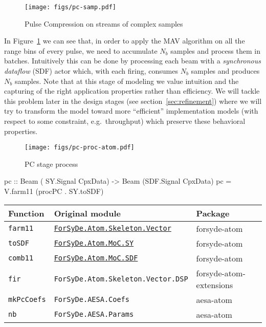 \documentclass[
  a4paper,
]{article}
\newenvironment{Shaded}{}{}
\newcommand{\DataTypeTok}[1]{\textcolor[rgb]{0.56,0.13,0.00}{#1}}
\newcommand{\FunctionTok}[1]{\textcolor[rgb]{0.02,0.16,0.49}{#1}}
\newcommand{\NormalTok}[1]{#1}
\newcommand{\OtherTok}[1]{\textcolor[rgb]{0.00,0.44,0.13}{#1}}
\begin{document}
\begin{figure}
\hypertarget{fig:pc-samp}{%
\centering
\texttt{[image: figs/pc-samp.pdf]}
\caption{Pulse Compression on streams of complex
samples}\label{fig:pc-samp}
}
\end{figure}

In Figure~\ref{fig:pc-samp} we can see that, in order to apply the MAV
algorithm on all the range bins of every pulse, we need to accumulate
\(N_b\) samples and process them in batches. Intuitively this can be
done by processing each beam with a \emph{synchronous dataflow} (SDF)
actor which, with each firing, consumes \(N_b\) samples and produces
\(N_b\) samples. Note that at this stage of modeling we value intuition
and the capturing of the right application properties rather than
efficiency. We will tackle this problem later in the design stages (see
section~\ref{sec:refinement}) where we will try to transform the model
toward more ``efficient'' implementation models (with respect to some
constraint, e.g.~throughput) which preserve these behavioral properties.

\begin{figure}
\hypertarget{fig:pc-proc-atom}{%
\centering
\texttt{[image: figs/pc-proc-atom.pdf]}
\caption{PC stage process}\label{fig:pc-proc-atom}
}
\end{figure}

\begin{Shaded}
\begin{Highlighting}[numbers=left,,firstnumber=213,]
\OtherTok{pc ::} \DataTypeTok{Beam}\NormalTok{ ( }\DataTypeTok{SY.Signal} \DataTypeTok{CpxData}\NormalTok{)}
   \OtherTok{->} \DataTypeTok{Beam}\NormalTok{ (}\DataTypeTok{SDF.Signal} \DataTypeTok{CpxData}\NormalTok{)}
\NormalTok{pc }\FunctionTok{=}\NormalTok{ V.farm11 (procPC }\FunctionTok{.}\NormalTok{ SY.toSDF)}
\end{Highlighting}
\end{Shaded}

\begin{longtable}[]{@{}lll@{}}
\toprule
Function & Original module & Package\tabularnewline
\midrule
\endhead
\texttt{farm11} &
\href{https://forsyde.github.io/forsyde-atom/api/ForSyDe-Atom-Skeleton-Vector.html}{\texttt{ForSyDe.Atom.Skeleton.Vector}}
& forsyde-atom\tabularnewline
\texttt{toSDF} &
\href{https://forsyde.github.io/forsyde-atom/api/ForSyDe-Atom-MoC-SY.html}{\texttt{ForSyDe.Atom.MoC.SY}}
& forsyde-atom\tabularnewline
\texttt{comb11} &
\href{https://forsyde.github.io/forsyde-atom/api/ForSyDe-Atom-MoC-SDF.html}{\texttt{ForSyDe.Atom.MoC.SDF}}
& forsyde-atom\tabularnewline
\texttt{fir} & \texttt{ForSyDe.Atom.Skeleton.Vector.DSP} &
forsyde-atom-extensions\tabularnewline
\texttt{mkPcCoefs} & \texttt{ForSyDe.AESA.Coefs} &
aesa-atom\tabularnewline
\texttt{nb} & \texttt{ForSyDe.AESA.Params} & aesa-atom\tabularnewline
\bottomrule
\end{longtable}
\end{document}

